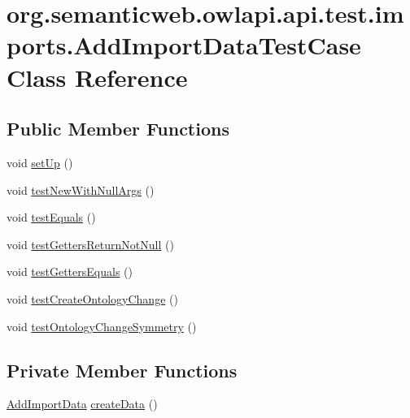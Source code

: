 \hypertarget{classorg_1_1semanticweb_1_1owlapi_1_1api_1_1test_1_1imports_1_1_add_import_data_test_case}{\section{org.\-semanticweb.\-owlapi.\-api.\-test.\-imports.\-Add\-Import\-Data\-Test\-Case Class Reference}
\label{classorg_1_1semanticweb_1_1owlapi_1_1api_1_1test_1_1imports_1_1_add_import_data_test_case}
}
\subsection*{Public Member Functions}
\begin{DoxyCompactItemize}
\item 
void \hyperlink{classorg_1_1semanticweb_1_1owlapi_1_1api_1_1test_1_1imports_1_1_add_import_data_test_case_a9489760e9cc623ad1e48a63e7df22b4d}{set\-Up} ()
\item 
void \hyperlink{classorg_1_1semanticweb_1_1owlapi_1_1api_1_1test_1_1imports_1_1_add_import_data_test_case_adada822e6408d90fac98882a19fd321c}{test\-New\-With\-Null\-Args} ()
\item 
void \hyperlink{classorg_1_1semanticweb_1_1owlapi_1_1api_1_1test_1_1imports_1_1_add_import_data_test_case_af263373b063a816f0eb9d0fa1eb8954e}{test\-Equals} ()
\item 
void \hyperlink{classorg_1_1semanticweb_1_1owlapi_1_1api_1_1test_1_1imports_1_1_add_import_data_test_case_a8267207e7254c4643cdbff8b15167e3d}{test\-Getters\-Return\-Not\-Null} ()
\item 
void \hyperlink{classorg_1_1semanticweb_1_1owlapi_1_1api_1_1test_1_1imports_1_1_add_import_data_test_case_a3e33259dc1f4a43d23b3ad39a3457400}{test\-Getters\-Equals} ()
\item 
void \hyperlink{classorg_1_1semanticweb_1_1owlapi_1_1api_1_1test_1_1imports_1_1_add_import_data_test_case_a470c085fbf77a71e7cf9234cb71349ca}{test\-Create\-Ontology\-Change} ()
\item 
void \hyperlink{classorg_1_1semanticweb_1_1owlapi_1_1api_1_1test_1_1imports_1_1_add_import_data_test_case_a31156f6a8a1c9655dedf92b31903d826}{test\-Ontology\-Change\-Symmetry} ()
\end{DoxyCompactItemize}
\subsection*{Private Member Functions}
\begin{DoxyCompactItemize}
\item 
\hyperlink{classorg_1_1semanticweb_1_1owlapi_1_1change_1_1_add_import_data}{Add\-Import\-Data} \hyperlink{classorg_1_1semanticweb_1_1owlapi_1_1api_1_1test_1_1imports_1_1_add_import_data_test_case_a390606bd15480a66ee3ac93632e63f94}{create\-Data} ()
\end{DoxyCompactItemize}
